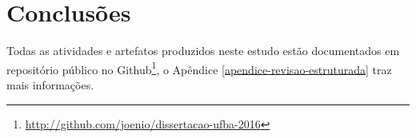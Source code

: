 \section{Conclusões}

Todas as atividades e artefatos produzidos neste estudo estão documentados em
repositório público no
Github\footnote{\url{http://github.com/joenio/dissertacao-ufba-2016}}, o
Apêndice \ref{apendice-revisao-estruturada} traz mais informações.



